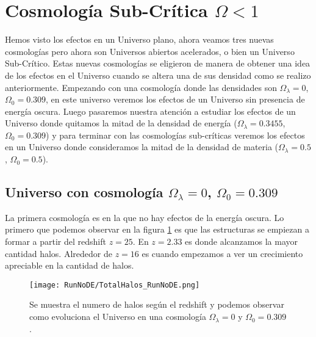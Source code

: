 \section[Cosmología Sub-Crítica \texorpdfstring{$\Omega < 1$}{Omega < 1}]{Cosmología Sub-Crítica \texorpdfstring{$\Omega < 1$}{Omega < 1}}

\noindent Hemos visto los efectos en un Universo plano, ahora veamos tres nuevas cosmologías pero ahora son Universos abiertos acelerados, o bien un Universo Sub-Crítico. Estas nuevas cosmologías se eligieron de manera de obtener una idea de los efectos en el Universo cuando se altera una de sus densidad como se realizo anteriormente. Empezando con una cosmología donde las densidades son $\Omega_\lambda = 0$, $\Omega_0 = 0.309$, en este universo veremos los efectos de un Universo sin presencia de energía oscura. Luego pasaremos nuestra atención a estudiar los efectos de un Universo donde quitamos la mitad de la densidad de energía ($\Omega_\lambda = 0.3455$, $\Omega_0 = 0.309$) y para terminar con las cosmologías sub-críticas veremos los efectos en un Universo donde consideramos la mitad de la densidad de materia ($\Omega_\lambda = 0.5$, $\Omega_0 = 0.5$).


\subsection{Universo con cosmología \texorpdfstring{$\Omega_\lambda = 0$, $\Omega_0 = 0.309$ }{Omega lambda = 0, Omega 0 = 0.309}  }

La primera cosmología es en la que no hay efectos de la energía oscura. Lo primero que podemos observar en la figura \ref{fig:NoDE_TotalHalos} es que las estructuras se empiezan a formar a partir del redshift $z=25$. En $z= 2.33$ es donde alcanzamos la mayor cantidad halos. Alrededor de $z = 16$ es cuando empezamos a ver un crecimiento apreciable en la cantidad de halos.

\begin{figure}[H]
    \centering
    \texttt{[image: RunNoDE/TotalHalos\_RunNoDE.png]}
    \caption[Evolución del número de halos en un Universo $\Omega_\lambda = 0$, $\Omega_0 = 0.309$]{\footnotesize Se muestra el numero de halos según el redshift y podemos observar como evoluciona el Universo en una cosmología $\Omega_\lambda = 0$ y $\Omega_0 = 0.309$.}
    \label{fig:NoDE_TotalHalos}
\end{figure}

